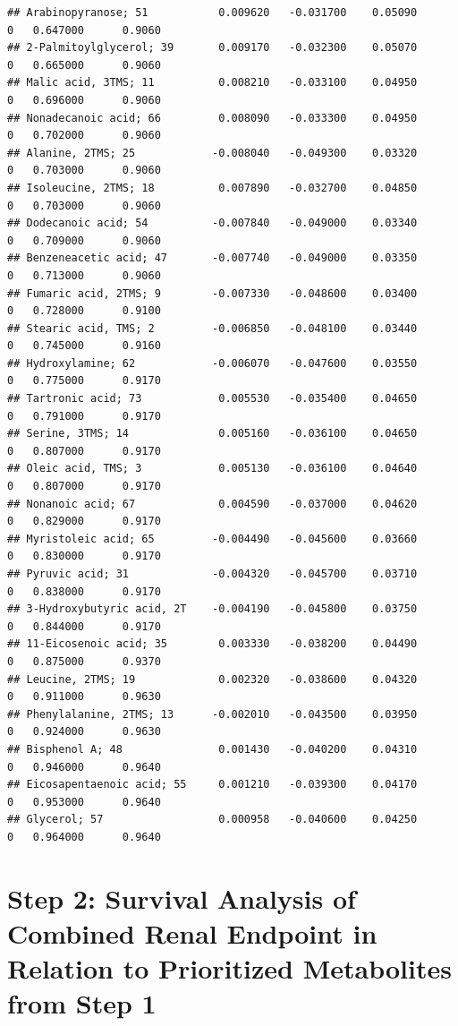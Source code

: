 \documentclass[]{article}
\begin{document}
\begin{verbatim}
## Arabinopyranose; 51           0.009620   -0.031700    0.05090         0   0.647000      0.9060
## 2-Palmitoylglycerol; 39       0.009170   -0.032300    0.05070         0   0.665000      0.9060
## Malic acid, 3TMS; 11          0.008210   -0.033100    0.04950         0   0.696000      0.9060
## Nonadecanoic acid; 66         0.008090   -0.033300    0.04950         0   0.702000      0.9060
## Alanine, 2TMS; 25            -0.008040   -0.049300    0.03320         0   0.703000      0.9060
## Isoleucine, 2TMS; 18          0.007890   -0.032700    0.04850         0   0.703000      0.9060
## Dodecanoic acid; 54          -0.007840   -0.049000    0.03340         0   0.709000      0.9060
## Benzeneacetic acid; 47       -0.007740   -0.049000    0.03350         0   0.713000      0.9060
## Fumaric acid, 2TMS; 9        -0.007330   -0.048600    0.03400         0   0.728000      0.9100
## Stearic acid, TMS; 2         -0.006850   -0.048100    0.03440         0   0.745000      0.9160
## Hydroxylamine; 62            -0.006070   -0.047600    0.03550         0   0.775000      0.9170
## Tartronic acid; 73            0.005530   -0.035400    0.04650         0   0.791000      0.9170
## Serine, 3TMS; 14              0.005160   -0.036100    0.04650         0   0.807000      0.9170
## Oleic acid, TMS; 3            0.005130   -0.036100    0.04640         0   0.807000      0.9170
## Nonanoic acid; 67             0.004590   -0.037000    0.04620         0   0.829000      0.9170
## Myristoleic acid; 65         -0.004490   -0.045600    0.03660         0   0.830000      0.9170
## Pyruvic acid; 31             -0.004320   -0.045700    0.03710         0   0.838000      0.9170
## 3-Hydroxybutyric acid, 2T    -0.004190   -0.045800    0.03750         0   0.844000      0.9170
## 11-Eicosenoic acid; 35        0.003330   -0.038200    0.04490         0   0.875000      0.9370
## Leucine, 2TMS; 19             0.002320   -0.038600    0.04320         0   0.911000      0.9630
## Phenylalanine, 2TMS; 13      -0.002010   -0.043500    0.03950         0   0.924000      0.9630
## Bisphenol A; 48               0.001430   -0.040200    0.04310         0   0.946000      0.9640
## Eicosapentaenoic acid; 55     0.001210   -0.039300    0.04170         0   0.953000      0.9640
## Glycerol; 57                  0.000958   -0.040600    0.04250         0   0.964000      0.9640
\end{verbatim}

\newpage

\hypertarget{step-2-survival-analysis-of-combined-renal-endpoint-in-relation-to-prioritized-metabolites-from-step-1}{%
\section{Step 2: Survival Analysis of Combined Renal Endpoint in
Relation to Prioritized Metabolites from Step
1}\label{step-2-survival-analysis-of-combined-renal-endpoint-in-relation-to-prioritized-metabolites-from-step-1}}
\end{document}
